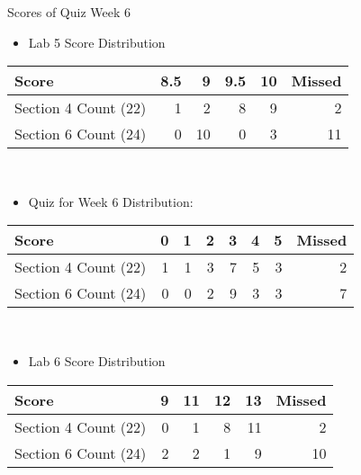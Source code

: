 \documentclass[presentation]{beamer}
\begin{document}
\begin{frame}[label=sec-5]{Scores of Quiz Week 6}
\\
\begin{itemize}
\item \alert{Lab 5} Score Distribution
\end{itemize}
\begin{center}
\begin{tabular}{lrrrrr}
\hline
Score & 8.5 & 9 & 9.5 & 10 & Missed\\
\hline
Section \alert{4} Count (22) & 1 & 2 & 8 & 9 & 2\\
\hline
Section \alert{6} Count (24) & 0 & 10 & 0 & 3 & 11\\
\hline
\end{tabular}
\end{center}
\\
\begin{itemize}
\item \alert{Quiz for Week 6} Distribution:
\end{itemize}
\begin{center}
\begin{tabular}{lrrrrrrr}
\hline
Score & 0 & 1 & 2 & 3 & 4 & 5 & Missed\\
\hline
Section \alert{4} Count (22) & 1 & 1 & 3 & 7 & 5 & 3 & 2\\
\hline
Section \alert{6} Count (24) & 0 & 0 & 2 & 9 & 3 & 3 & 7\\
\hline
\end{tabular}
\end{center}
\\
\begin{itemize}
\item \alert{Lab 6} Score Distribution
\end{itemize}
\begin{center}
\begin{tabular}{lrrrrr}
\hline
Score & 9 & 11 & 12 & 13 & Missed\\
\hline
Section \alert{4} Count (22) & 0 & 1 & 8 & 11 & 2\\
\hline
Section \alert{6} Count (24) & 2 & 2 & 1 & 9 & 10\\
\hline
\end{tabular}
\end{center}
\end{frame}
\end{document}
